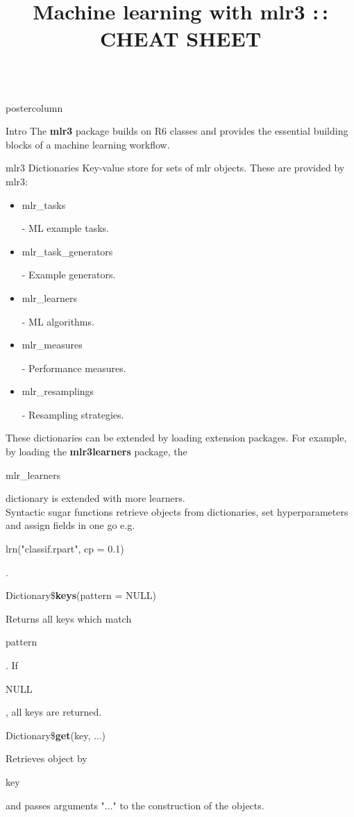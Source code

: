 \documentclass{beamer}
\title{Machine learning with mlr3 :\,: CHEAT SHEET} %
\newlength{\columnheight} %
\newcommand{\codeinline}[1]{\begin{codeboxinline}#1\end{codeboxinline}}
\begin{document}
\begin{frame}[fragile]{}
	\begin{columns}
		\begin{column}{.245\textwidth}
			\begin{beamercolorbox}[center]{postercolumn}
				\begin{minipage}{.98\textwidth}
					\parbox[t][\columnheight]{\textwidth}{
						\begin{myblock}{Intro}
							The \textbf{mlr3} package builds on R6 classes and provides the essential building
							blocks of a machine learning workflow.
						\end{myblock}
						\begin{myblock}{mlr3 Dictionaries}
							Key-value store for sets of mlr objects. These are provided by mlr3:
							\begin{itemize}
								\item \codeinline{mlr\_tasks} - ML example tasks.
								\item \codeinline{mlr\_task\_generators} - Example generators.
								\item \codeinline{mlr\_learners} - ML algorithms.
								\item \codeinline{mlr\_measures} - Performance measures.
								\item \codeinline{mlr\_resamplings} - Resampling strategies.
							\end{itemize}
							\vspace{0.5em}
							These dictionaries can be extended by loading extension packages.
							For example, by loading the \textbf{mlr3learners} package, the \codeinline {mlr\_learners} dictionary is extended with more learners.
							\vspace{1em}
							\\
							Syntactic sugar functions retrieve objects from dictionaries, set hyperparameters and assign fields in one go e.g. \codeinline{lrn("classif.rpart", cp = 0.1)}.
							\\
							\begin{codebox}
								Dictionary\$\textbf{keys}(pattern = NULL)
							\end{codebox}
							Returns all keys which match \codeinline{pattern}.
							If \codeinline{NULL}, all keys are returned.
							\\
							\begin{codebox}
								Dictionary\$\textbf{get}(key, ...)
							\end{codebox}
							Retrieves object by \codeinline{key} and passes arguments "..." to the construction of the objects.

\end{myblock}}
\end{minipage}
\end{beamercolorbox}
\end{column}
\end{columns}
\end{frame}
\end{document}
